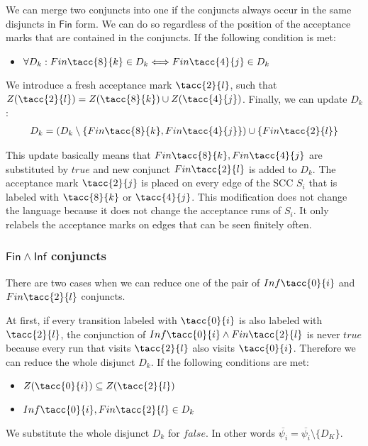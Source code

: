 \documentclass[a4paper,UKenglish,cleveref, autoref, thm-restate]{lipics-v2021}
\def\Inf{\ensuremath{\mathsf{Inf}}}
\def\Fin{\ensuremath{\mathsf{Fin}}}
\def\false{\mathit{false}}
\def\true{\mathit{true}}
\begin{document}
We can merge two conjuncts into one if the conjuncts always occur in the same disjuncts in $\Fin$ form. We can do so regardless of the position of the acceptance marks that are contained in the conjuncts. 
If the following condition is met:
\begin{itemize}
    \item $\forall D_{k}: \Fin\tacc{8}{k} \in D_{k} \Longleftrightarrow \Fin\tacc{4}{j} \in D_{k}$
\end{itemize}
We introduce a fresh acceptance mark $\tacc{2}{l}$, such that $Z(\tacc{2}{l}) = Z(\tacc{8}{k}) \cup Z(\tacc{4}{j})$.
 Finally, we can update $D_{k}$:
\begin{align*}
    D_{k} = (D_{k} \setminus \{ \Fin\tacc{8}{k}, \Fin\tacc{4}{j} \}) \cup \{\Fin\tacc{2}{l}\}
\end{align*}

This update basically means that $\Fin\tacc{8}{k}, \Fin\tacc{4}{j}$ are substituted by $\true$ and new conjunct $\Fin\tacc{2}{l}$ is added to $D_{k}$. The acceptance mark $\tacc{2}{j}$ is placed on every edge of the SCC $S_{i}$ that is labeled with $\tacc{8}{k}$ or $\tacc{4}{j}$.
This modification does not change the language because it does not change the acceptance runs of $S_{i}$. It only relabels the acceptance marks on edges that can be seen finitely often. 



\subsubsection{$\Fin \land \Inf$ conjuncts\\}
There are two cases when we can reduce one of the pair of $\Inf\tacc{0}{i}$ and $\Fin\tacc{2}{l}$ conjuncts.

At first, if every transition labeled with  $\tacc{0}{i}$ is also labeled with $\tacc{2}{l}$, the conjunction of $\Inf\tacc{0}{i} \land \Fin\tacc{2}{l}$ is never $\true$ because every run that visits $\tacc{2}{l}$ also visits $\tacc{0}{i}$. Therefore we can reduce the whole disjunct $D_{k}$.
If the following conditions are met:
\begin{itemize}
    \item $Z(\tacc{0}{i}) \subseteq Z(\tacc{2}{l})$
    \item $\Inf\tacc{0}{i}, \Fin\tacc{2}{l} \in D_{k}$
\end{itemize}
We substitute the whole disjunct $D_{k}$ for $\false$. In other words $\overline{\psi_{i}} = \overline{\psi_{i}} \setminus \{D_{K}\}$.
\end{document}

